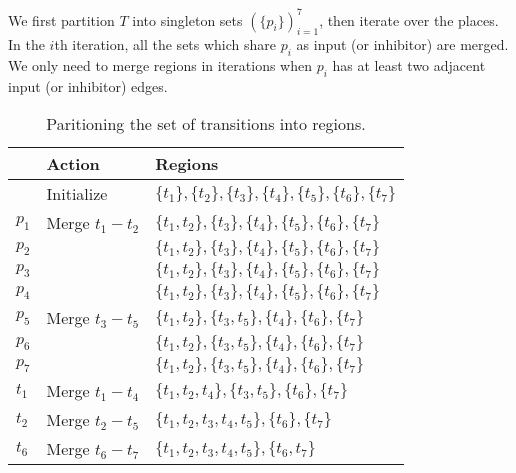 \documentclass[a4paper,10pt,twoside,openright]{memoir}
\begin{document}
We first partition $T$ into singleton sets $(\{p_i\})_{i = 1}^7$, then
iterate over the places. In the $i$th iteration, all the sets which
share $p_i$ as input (or inhibitor) are merged. We only need to merge
regions in iterations when $p_i$ has at least two adjacent input (or
inhibitor) edges.


\begin{table}
  {\centering
    \begin{tabular}{@{}lll@{}}
      \toprule
      & Action & Regions \\
      \midrule
      & Initialize & $\{t_1\}, \{t_2\}, \{t_3\}, \{t_4\}, \{t_5\},
                     \{t_6\}, \{t_7\}$ \\[1.5ex]
      $p_1$ & Merge $t_1 - t_2$ & $\{t_1, t_2\}, \{t_3\}, \{t_4\}, \{t_5\},
                     \{t_6\}, \{t_7\}$ \\
      $p_2$ & & $\{t_1, t_2\}, \{t_3\}, \{t_4\}, \{t_5\},
                     \{t_6\}, \{t_7\}$ \\
      $p_3$ & & $\{t_1, t_2\}, \{t_3\}, \{t_4\}, \{t_5\},
                     \{t_6\}, \{t_7\}$ \\
      $p_4$ & & $\{t_1, t_2\}, \{t_3\}, \{t_4\}, \{t_5\},
                     \{t_6\}, \{t_7\}$ \\
      $p_5$ & Merge $t_3 - t_5$ & $\{t_1, t_2\}, \{t_3, t_5\}, \{t_4\},
                     \{t_6\}, \{t_7\}$ \\
      $p_6$ & & $\{t_1, t_2\}, \{t_3, t_5\}, \{t_4\},
                     \{t_6\}, \{t_7\}$ \\
      $p_7$ & & $\{t_1, t_2\}, \{t_3, t_5\}, \{t_4\},
                     \{t_6\}, \{t_7\}$ \\[1.5ex]
      $t_1$ & Merge $t_1 - t_4$ & $\{t_1, t_2, t_4\}, \{t_3, t_5\},
                     \{t_6\}, \{t_7\}$ \\
      $t_2$ & Merge $t_2 - t_5$ & $\{t_1, t_2, t_3, t_4, t_5\},
                     \{t_6\}, \{t_7\}$ \\[1.5ex]
      $t_6$ & Merge $t_6 - t_7$ & $\{t_1, t_2, t_3, t_4, t_5\},
                     \{t_6, t_7\}$ \\
      \bottomrule
    \end{tabular}
    \par}
  \caption{Paritioning the set of transitions into regions.}
  \label{tbl:example:partition}
\end{table}
\end{document}
